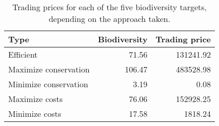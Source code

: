 \begin{table}

\caption{\label{tab:trading-prices}Trading prices for each of the five biodiversity targets, depending on the approach taken.}
\centering
\begin{tabular}[t]{l|r|r}
\hline
Type & Biodiversity & Trading price\\
\hline
Efficient & 71.56 & 131241.92\\
\hline
Maximize conservation & 106.47 & 483528.98\\
\hline
Minimize conservation & 3.19 & 0.08\\
\hline
Maximize costs & 76.06 & 152928.25\\
\hline
Minimize costs & 17.58 & 1818.24\\
\hline
\end{tabular}
\end{table}